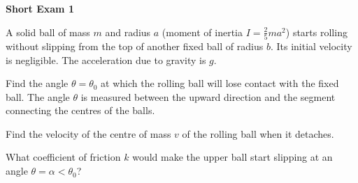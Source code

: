 \documentclass[../TST.tex]{subfiles}
\begin{document}
\begin{large}
	\textbf{Short Exam 1}
\end{large}
\begin{sproblem}
A solid ball of mass $m$ and radius $a$ (moment of inertia $I=\frac{2}{5}ma^2$) starts rolling without slipping from the top of another fixed ball of radius $b$. Its initial velocity is negligible. The acceleration due to gravity is $g$.
\end{sproblem}

\begin{subpart}
	\item Find the angle $\theta=\theta_0$ at which the rolling ball will lose contact with the fixed ball. The angle $\theta$ is measured between the upward direction and the segment connecting the centres of the balls.
	\item Find the velocity  of the centre of mass $v$ of the rolling ball when it detaches.
	\item What coefficient of friction $k$ would make the upper ball start slipping at an angle $\theta=\alpha<\theta_0$?
\end{subpart}
\end{document}
